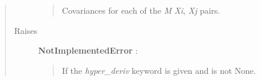 \documentclass[letterpaper,10pt,english]{sphinxmanual}
\begin{document}
\begin{fulllineitems}
\begin{fulllineitems}
\begin{quote}
\begin{description}
\begin{quote}
Covariances for each of the \emph{M} \emph{Xi}, \emph{Xj} pairs.
\end{quote}

\item[{Raises }] \leavevmode
\textbf{NotImplementedError} :
\begin{quote}

If the \emph{hyper\_deriv} keyword is given and is not None.
\end{quote}

\end{description}\end{quote}

\end{fulllineitems}


\end{fulllineitems}

\end{document}
